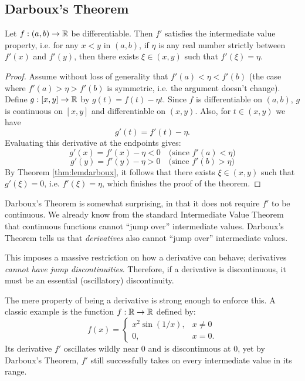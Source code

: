 \documentclass[../analysis1.tex]{subfiles}
\begin{document}
\subsection{Darboux's Theorem}

\begin{theorem}
    \begin{shaded*}
        Let $f: (a,b) \to \mathbb{R}$ be differentiable. Then $f'$ satisfies the intermediate value property, i.e. for any $x<y$ in $(a,b)$, if $\eta$ is any real number strictly between $f'(x)$ and $f'(y)$, then there exists $\xi \in (x,y)$ such that $f'(\xi) = \eta$.
    \end{shaded*}
\end{theorem}


\begin{proof}
    Assume without loss of generality that $f'(a) < \eta < f'(b)$ (the case where $f'(a) > \eta > f'(b)$ is symmetric, i.e. the argument doesn't change). Define $g: [x,y] \to \mathbb{R}$ by $g(t) = f(t) - \eta t$.
    Since $f$ is differentiable on $(a,b)$, $g$ is continuous on $[x,y]$ and differentiable on $(x,y)$. Also, for $t\in(x,y)$ we have
    \[ g'(t) = f'(t) - \eta. \]
    Evaluating this derivative at the endpoints gives:
    \[ g'(x) = f'(x) - \eta < 0 \quad \text{(since } f'(a) < \eta) \]
    \[ g'(y) = f'(y) - \eta > 0 \quad \text{(since } f'(b) > \eta) \]
    By Theorem \ref{thm:lemdarboux}, it follows that there exists $\xi\in(x,y)$ such that $g'(\xi)=0$, i.e. $f'(\xi)=\eta$, which finishes the proof of the theorem.\qedhere
   
\end{proof}

\begin{remark}
    Darboux's Theorem is somewhat surprising, in that it does not require $f'$ to be continuous. We already know from the standard Intermediate Value Theorem that continuous functions cannot ``jump over'' intermediate values. Darboux's Theorem tells us that \textit{derivatives} also cannot ``jump over'' intermediate values. 
    
    This imposes a massive restriction on how a derivative can behave; derivatives \textit{cannot have jump discontinuities}. Therefore, if a derivative is discontinuous, it must be an essential (oscillatory) discontinuity.
    
    The mere property of being a derivative is strong enough to enforce this. A classic example is the function $f:\mathbb{R}\to\mathbb{R}$ defined by:
    \[ f(x) = \begin{cases} x^2\sin(1/x), &  x \neq 0 \\ 0, &  x = 0. \end{cases} \]
    Its derivative $f'$ oscillates wildly near 0 and is discontinuous at 0, yet by Darboux's Theorem, $f'$ still successfully takes on every intermediate value in its range.
\end{remark}
\end{document}
